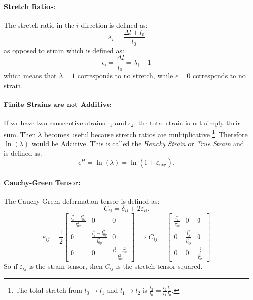 \paragraph{Stretch Ratios:}
The stretch ratio in the $i$ direction is defined as:
\begin{equation}
	\lambda_i = \frac{\Delta l + l_0}{l_0} 
\end{equation}
as opposed to strain which is defined as:
\begin{equation}
	\epsilon_i = \frac{\Delta l}{l_0} = \lambda_i - 1
\end{equation}
which means that $\lambda = 1$ corresponds to no stretch, while $\epsilon = 0$ corresponds to no strain.

\paragraph{Finite Strains are not Additive:}
If we have two consecutive strains $\epsilon_1$ and $\epsilon_2$, the total strain is not simply their sum.
Then $\lambda$ becomes useful because stretch ratios are multiplicative
\footnote{The total stretch from $l_0\to l_1$ and $l_1\to l_2$ is $\frac{l_2}{l_0} = \frac{l_2}{l_1}\frac{l_1}{l_0}$.}. 
Therefore $\ln(\lambda)$ would be Additive.
This is called the \textit{Hencky Strain} or \textit{True Strain} and is defined as:
\begin{equation}
	\epsilon^H = \ln(\lambda) = \ln(1 + \varepsilon_{\text{eng}}).
\end{equation}

\paragraph{Cauchy-Green Tensor:}
The Cauchy-Green deformation tensor is defined as:
\begin{equation}
	C_{ij} = \delta_{ij} + 2 \varepsilon_{ij}.
\end{equation}
\begin{equation}
	\varepsilon_{ij} = \frac12 \begin{bmatrix}
		\frac{l_x^2 - l_{0x}^2}{l_{0x}^2} & 0 & 0 \\
		0 & \frac{l_y^2 - l_{0y}^2}{l_{0y}^2} & 0 \\
		0 & 0 & \frac{l_z^2 - l_{0z}^2}{l_{0z}^2}
	\end{bmatrix} \implies
	C_{ij} = \begin{bmatrix}
		\frac{l_x^2}{l_{0x}^2} & 0 & 0 \\
		0 & \frac{l_y^2}{l_{0y}^2} & 0 \\
		0 & 0 & \frac{l_z^2}{l_{0z}^2}
	\end{bmatrix}
\end{equation}
So if $\varepsilon_{ij}$ is the strain tensor, then $C_{ij}$ is the stretch tensor squared.

